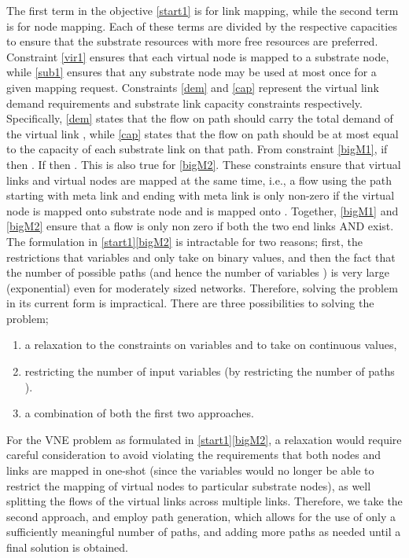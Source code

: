 \documentclass[journal]{IEEEtran}
\begin{document}
\indent The first term in the objective \eqref{start1} is for link mapping, while the second term is for node mapping. Each of these terms are divided by the respective capacities to ensure that the substrate resources with more free resources are preferred. Constraint \eqref{vir1} ensures that each virtual node is mapped to a substrate node, while \eqref{sub1} ensures that any substrate node may be used at most once for a given mapping request. Constraints \eqref{dem} and \eqref{cap} represent the virtual link demand requirements and substrate link capacity constraints respectively. Specifically, \eqref{dem} states that the flow  on path  should carry the total demand of the virtual link , while \eqref{cap} states that the flow  on path  should be at most equal to the capacity of each substrate link on that path. From constraint \eqref{bigM1}, if  then . If  then . This is also true for \eqref{bigM2}. These constraints ensure that virtual links and virtual nodes are mapped at the same time, i.e., a flow   using the path  starting with meta link  and ending with meta link    is only non-zero if the virtual node  is mapped onto substrate node  and  is mapped onto . Together, \eqref{bigM1} and \eqref{bigM2} ensure that a flow  is only non zero if both the two end links  AND  exist.\\
\indent The formulation in \eqref{start1}\eqref{bigM2} is intractable for two reasons; first, the restrictions that variables  and  only take on binary values, and then the fact that the number of possible paths  (and hence the number of variables ) is very large (exponential) even for moderately sized networks. Therefore, solving the problem in its current form is impractical. There are three possibilities to solving the problem;
\begin{enumerate}
\item a relaxation to the constraints on variables  and  to take on continuous values,
\item restricting the number of input variables  (by restricting the number of paths ).
\item a combination of both the first two approaches.
\end{enumerate}
For the VNE problem as formulated in \eqref{start1}\eqref{bigM2}, a relaxation would require careful consideration to avoid violating the requirements that both nodes and links are mapped in one-shot (since the variables  would no longer be able to restrict the mapping of virtual nodes to particular substrate nodes), as well splitting the flows of the virtual links across multiple links. Therefore, we take the second approach, and employ path generation, which allows for the use of only a sufficiently meaningful number of paths, and adding more paths as needed until a final solution is obtained.
\end{document}
